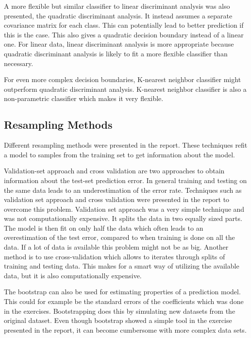 A more flexible but similar classifier to linear discriminant analysis was also presented, the quadratic discriminant analysis. It instead assumes a separate covariance matrix for each class. This can potentially lead to better prediction if this is the case. This also gives a quadratic decision boundary instead of a linear one. For linear data, linear discriminant analysis is more appropriate because quadratic discriminant analysis is likely to fit a more flexible classifier than necessary.

For even more complex decision boundaries, K-nearest neighbor classifier might outperform quadratic discriminant analysis. K-nearest neighbor classifier is also a non-parametric classifier which makes it very flexible.

\subsection{Resampling Methods}
Different resampling methods were presented in the report. These techniques refit a model to samples from the training set to get information about the model. 

Validation-set approach and cross validation are two approaches to obtain information about the test-set prediction error. In general training and testing on the same data leads to an underestimation of the error rate. Techniques such as validation set approach and cross validation were presented in the report to overcome this problem. Validation set approach was a very simple technique and was not computationally expensive. It splits the data in two equally sized parts. The model is then fit on only half the data which often leads to an overestimation of the test error, compared to when training is done on all the data. If a lot of data is available this problem might not be as big. Another method is to use cross-validation which allows to iterates through splits of training and testing data. This makes for a smart way of utilizing the available data, but it is also computationally expensive.

The bootstrap can also be used for estimating properties of a prediction model. This could for example be the standard errors of the coefficients which was done in the exercises. Bootstrapping does this by simulating new datasets from the original dataset. Even though bootstrap showed a simple tool in the exercise presented in the report, it can become cumbersome with more complex data sets.

